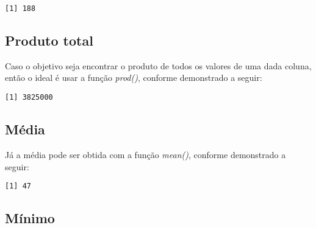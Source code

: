 \documentclass[
  letterpaper,
  DIV=11,
  numbers=noendperiod]{scrreprt}
\newenvironment{Shaded}{\begin{snugshade}}{\end{snugshade}}
\newcommand{\AttributeTok}[1]{\textcolor[rgb]{0.40,0.45,0.13}{#1}}
\newcommand{\ConstantTok}[1]{\textcolor[rgb]{0.56,0.35,0.01}{#1}}
\newcommand{\FunctionTok}[1]{\textcolor[rgb]{0.28,0.35,0.67}{#1}}
\newcommand{\NormalTok}[1]{\textcolor[rgb]{0.00,0.23,0.31}{#1}}
\newcommand{\SpecialCharTok}[1]{\textcolor[rgb]{0.37,0.37,0.37}{#1}}
\begin{document}
\begin{Shaded}
\end{Shaded}

\begin{verbatim}
[1] 188
\end{verbatim}

\subsection{Produto total}\label{produto-total}

Caso o objetivo seja encontrar o produto de todos os valores de uma dada
coluna, então o ideal é usar a função \emph{prod()}, conforme
demonstrado a seguir:

\begin{Shaded}
\end{Shaded}

\begin{verbatim}
[1] 3825000
\end{verbatim}

\subsection{Média}\label{muxe9dia}

Já a média pode ser obtida com a função \emph{mean()}, conforme
demonstrado a seguir:

\begin{Shaded}
\end{Shaded}

\begin{verbatim}
[1] 47
\end{verbatim}

\subsection{Mínimo}\label{muxednimo}
\end{document}
